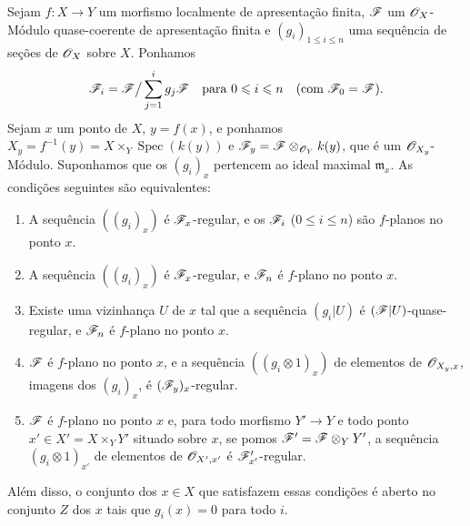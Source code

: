 \begin{theorem}[11.3.8]
\label{IV.11.3.8}
Sejam $f:X\to Y$ um morfismo localmente de apresentação
finita, $\mathscr{F}$ um $\mathscr{O}_X$-Módulo quase-coerente de
apresentação finita e $(g_i)_{1\leq i\leq n}$ uma sequência
de seções de $\mathscr{O}_X$ sobre $X$. Ponhamos
\[
\mathscr{F}_i=\mathscr{F}\big/\sum_{j=1}^{i}g_j\mathscr{F}
\quad\text{para }0\leqslant i\leqslant n
\quad(\text{com }\mathscr{F}_0=\mathscr{F}).
\]
Sejam $x$ um ponto de $X$, $y=f(x)$, e ponhamos
$X_y=f^{-1}(y)=X\times_Y\operatorname{Spec}(k(y))$ e
$\mathscr{F}_y=\mathscr{F}\otimes_{\mathscr{O}_Y}k(y)$,
que é um $\mathscr{O}_{X_y}$-Módulo.
Suponhamos que os $(g_i)_x$ pertencem ao ideal maximal
$\mathfrak m_x$. As condições seguintes são equivalentes:
\begin{enumerate}[label=\emph{\alph*)}]
\item A sequência $((g_i)_x)$ é $\mathscr{F}_x$-regular,
e os $\mathscr{F}_i$ ($0\leq i\leq n$) são $f$-planos
no ponto $x$.
\item A sequência $((g_i)_x)$ é $\mathscr{F}_x$-regular,
e $\mathscr{F}_n$ é $f$-plano no ponto $x$.
\item[\emph{b$'$)}] Existe uma vizinhança $U$ de $x$
tal que a sequência $(g_i|U)$ é
$(\mathscr{F}|U)$-quase-regular, e $\mathscr{F}_n$ é
$f$-plano no ponto $x$.


\item $\mathscr{F}$ é $f$-plano no ponto $x$, e a
sequência $((g_i\otimes1)_x)$ de elementos de
$\mathscr{O}_{X_y,x}$, imagens dos $(g_i)_x$, é
$(\mathscr{F}_y)_x$-regular.
\item $\mathscr{F}$ é $f$-plano no ponto $x$ e, para todo
morfismo $Y'\to Y$ e todo ponto
$x'\in X'=X\times_YY'$ situado sobre $x$,
se pomos $\mathscr{F}'=\mathscr{F}\otimes_YY'$,
a sequência $(g_i\otimes1)_{x'}$ de elementos de
$\mathscr{O}_{X',x'}$ é $\mathscr{F}'_{x'}$-regular.
\end{enumerate}
Além disso, o conjunto dos $x\in X$ que satisfazem
essas condições é aberto no conjunto $Z$ dos $x$
tais que $g_i(x)=0$ para todo $i$.
\end{theorem}

